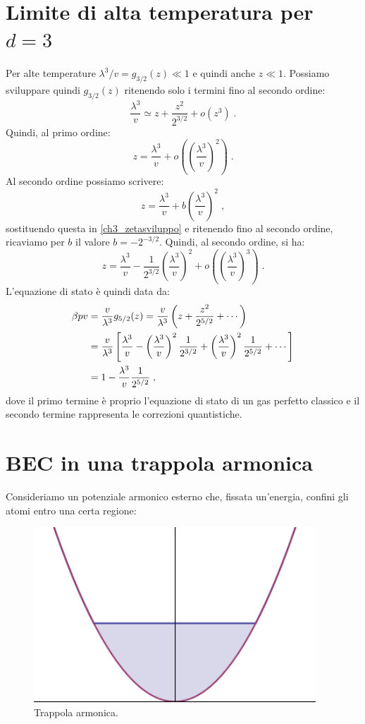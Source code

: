 \documentclass[10pt,a4paper]{report}
\theoremstyle{definition}
\numberwithin{equation}{section}
\begin{document}
\section{Limite di alta temperatura per $d=3$}
Per alte temperature $\lambda^3/v=g_{3/2}(z)\ll 1$ e quindi anche $z\ll 1$. Possiamo sviluppare quindi $g_{3/2}(z)$ ritenendo solo i termini fino al secondo ordine:
\begin{equation}
\frac{\lambda^3}{v}\simeq z+\frac{z^2}{2^{3/2}}+o(z^3)\;. \label{ch3_zetasviluppo}
\end{equation}
Quindi, al primo ordine:
\begin{equation}
z=\frac{\lambda^3}{v}+o\left(\left(\frac{\lambda^3}{v}\right)^2\right)\;.
\end{equation}
Al secondo ordine possiamo scrivere:
$$
z=\frac{\lambda^3}{v}+b\left(\frac{\lambda^3}{v}\right)^2\;,
$$
sostituendo questa in \eqref{ch3_zetasviluppo} e ritenendo fino al secondo ordine, ricaviamo per $b$ il valore $b=-2^{-3/2}$. Quindi, al secondo ordine, si ha:
\begin{equation}
z=\frac{\lambda^3}{v}-\frac{1}{2^{3/2}}\left(\frac{\lambda^3}{v}\right)^2+o\left(\left(\frac{\lambda^3}{v}\right)^3\right)\;.
\end{equation}
L'equazione di stato è quindi data da:
\begin{align}
\beta pv &=\frac{v}{\lambda^3}g_{5/2}(z)=\frac{v}{\lambda^3}\left(z+\frac{z^2}{2^{5/2}}+\cdots\right) \notag \\
&=\frac{v}{\lambda^3}\left[\frac{\lambda^3}{v}-\left(\frac{\lambda^3}{v}\right)^2\frac{1}{2^{3/2}}+\left(\frac{\lambda^3}{v}\right)^2\frac{1}{2^{5/2}}+\cdots\right] \notag \\
&= 1-\frac{\lambda^3}{v}\frac{1}{2^{5/2}}\;,
\end{align}
dove il primo termine è proprio l'equazione di stato di un gas perfetto classico e il secondo termine rappresenta le correzioni quantistiche.
\section{BEC in una trappola armonica}
Consideriamo un potenziale armonico esterno che, fissata un'energia, confini gli atomi entro una certa regione:
\begin{figure}[h]
\centering
\includegraphics[width=300pt,keepaspectratio=true]{Addons/potentialwell}
\caption{\footnotesize{Trappola armonica.}}
\end{figure}
\pagebreak
\end{document}
